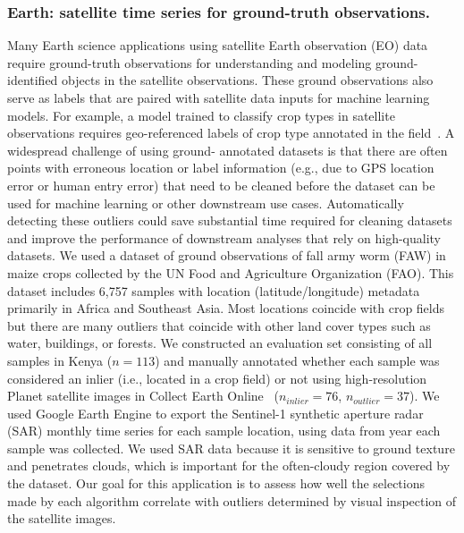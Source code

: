 \documentclass[letterpaper]{article} %
\newcommand{\todo}[1]{\textcolor{blue}{#1}}
\begin{document}
\subsubsection{Earth: satellite time series for ground-truth observations.}
Many Earth science applications using satellite Earth observation (EO) data
 require ground-truth observations for understanding and modeling ground-
 identified objects in the satellite observations. These ground observations
 also serve as labels that are paired with satellite data inputs for machine 
 learning models. For example, a model trained to classify crop types in
 satellite observations requires geo-referenced labels of crop type annotated
 in the field~\cite{tseng2021learning}. A widespread challenge of using ground-
 annotated datasets is that there are often points with erroneous location or 
 label information (e.g., due to GPS location error or human entry error) that
 need to be cleaned before the dataset can be used for machine learning or
 other downstream use cases. Automatically detecting these outliers could save 
 substantial time required for cleaning datasets and improve the performance of
 downstream analyses that rely on high-quality datasets. 
 We used a dataset of ground
 observations of fall army worm (FAW) in maize crops collected by the UN Food
 and Agriculture Organization (FAO). This dataset includes 6,757 samples
 with location (latitude/longitude) metadata primarily in Africa and Southeast
 Asia. Most locations coincide with crop
 fields but there are many outliers that coincide with other land cover types 
 such as water, buildings, or forests. We constructed an evaluation set 
 consisting of all samples in Kenya ($n=113$) and manually annotated whether 
 each sample was considered an inlier (i.e., located in a crop field) or not 
 using high-resolution Planet satellite images in Collect Earth 
 Online~\cite{planetdata} ($n_{inlier}=76$, $n_{outlier}=37$). We used Google
 Earth Engine to export the Sentinel-1 synthetic aperture radar (SAR) monthly
 time series for each sample location, using data from year each sample was 
 collected. We used SAR data because it is sensitive to ground texture and
  penetrates clouds, which is important for the often-cloudy region covered
  by the dataset. Our goal for this application is to assess how well the 
  selections made by each algorithm correlate with outliers determined by
  visual inspection of the satellite images.
\end{document}
